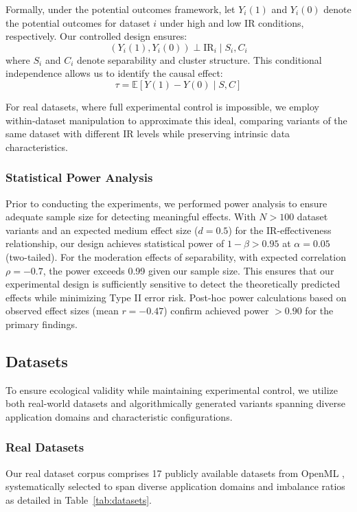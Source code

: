 \documentclass[12pt,a4paper]{article}
\theoremstyle{definition}
\begin{document}
Formally, under the potential outcomes framework, let $Y_i(1)$ and $Y_i(0)$ denote the potential outcomes for dataset $i$ under high and low IR conditions, respectively. Our controlled design ensures:
\begin{equation}
(Y_i(1), Y_i(0)) \perp \text{IR}_i \mid S_i, C_i
\end{equation}
where $S_i$ and $C_i$ denote separability and cluster structure. This conditional independence allows us to identify the causal effect:
\begin{equation}
\tau = \mathbb{E}[Y(1) - Y(0) \mid S, C]
\end{equation}

For real datasets, where full experimental control is impossible, we employ within-dataset manipulation to approximate this ideal, comparing variants of the same dataset with different IR levels while preserving intrinsic data characteristics.

\subsubsection{Statistical Power Analysis}
Prior to conducting the experiments, we performed power analysis to ensure adequate sample size for detecting meaningful effects. With $N > 100$ dataset variants and an expected medium effect size ($d = 0.5$) for the IR-effectiveness relationship, our design achieves statistical power of $1 - \beta > 0.95$ at $\alpha = 0.05$ (two-tailed). For the moderation effects of separability, with expected correlation $\rho = -0.7$, the power exceeds 0.99 given our sample size. This ensures that our experimental design is sufficiently sensitive to detect the theoretically predicted effects while minimizing Type II error risk. Post-hoc power calculations based on observed effect sizes (mean $r = -0.47$) confirm achieved power $> 0.90$ for the primary findings.

\subsection{Datasets}
To ensure ecological validity while maintaining experimental control, we utilize both real-world datasets and algorithmically generated variants spanning diverse application domains and characteristic configurations.

\subsubsection{Real Datasets}
Our real dataset corpus comprises 17 publicly available datasets from OpenML \cite{OpenML2013}, systematically selected to span diverse application domains and imbalance ratios as detailed in Table~\ref{tab:datasets}.
\end{document}
